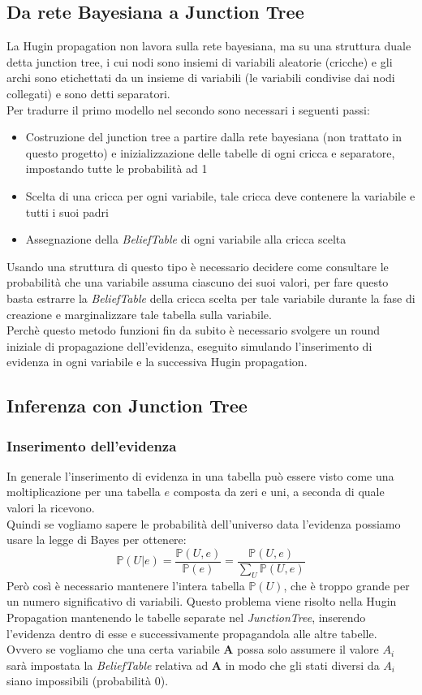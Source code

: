 \documentclass[a4paper]{article}
\begin{document}
\subsection{Da rete Bayesiana a Junction Tree}
La Hugin propagation non lavora sulla rete bayesiana, ma su una struttura duale detta junction tree, i cui nodi sono insiemi di variabili aleatorie (cricche) e gli archi sono etichettati da un insieme di variabili (le variabili condivise dai nodi collegati) e sono detti separatori.\\
Per tradurre il primo modello nel secondo sono necessari i seguenti passi:
\begin{itemize}
\item Costruzione del junction tree a partire dalla rete bayesiana (non trattato in questo progetto) e inizializzazione delle tabelle di ogni cricca e separatore, impostando tutte le probabilità ad 1
\item Scelta di una cricca per ogni variabile, tale cricca deve contenere la variabile e tutti i suoi padri
\item Assegnazione della \emph{BeliefTable} di ogni variabile alla cricca scelta
\end{itemize}
Usando una struttura di questo tipo è necessario decidere come consultare le probabilità che una variabile assuma ciascuno dei suoi valori, per fare questo basta estrarre la \emph{BeliefTable} della cricca scelta per tale variabile durante la fase di creazione e marginalizzare tale tabella sulla variabile.\\
Perchè questo metodo funzioni fin da subito è necessario svolgere un round iniziale di  propagazione dell'evidenza, eseguito simulando l'inserimento di evidenza in ogni variabile e la successiva Hugin propagation.
\subsection{Inferenza con Junction Tree}
\subsubsection{Inserimento dell'evidenza}
In generale l'inserimento di evidenza in una tabella può essere visto come una moltiplicazione per una tabella $e$ composta da zeri e uni, a seconda di quale valori la ricevono.\\
Quindi se vogliamo sapere le probabilità dell'universo data l'evidenza possiamo usare la legge di Bayes per ottenere:
$$ \mathbb{P}(U|e)= \frac{\mathbb{P}(U,e)}{\mathbb{P}(e)}=\frac{\mathbb{P}(U,e)}{\sum_U \mathbb{P}(U,e)}$$
Però così è necessario mantenere l'intera tabella $\mathbb{P}(U)$, che è troppo grande per un numero significativo di variabili. Questo problema viene risolto nella Hugin Propagation mantenendo le tabelle separate nel \emph{JunctionTree}, inserendo l'evidenza dentro di esse e successivamente propagandola alle altre tabelle.\\
Ovvero se vogliamo che una certa variabile \textbf{A} possa solo assumere il valore $A_i$ sarà impostata la \emph{BeliefTable} relativa ad \textbf{A} in modo che gli stati diversi da $A_i$ siano impossibili (probabilità 0).
\end{document}
